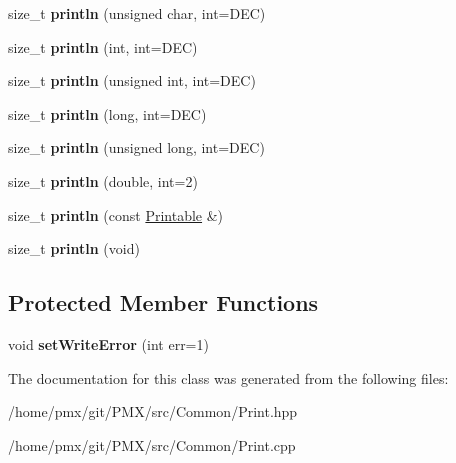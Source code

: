 \begin{DoxyCompactItemize}
size\+\_\+t {\bfseries println} (unsigned char, int=D\+EC)
\item 
\mbox{\label{classPrint_a738c88471cfb8eac7c8a804699971413}} 
size\+\_\+t {\bfseries println} (int, int=D\+EC)
\item 
\mbox{\label{classPrint_ac87eed1fcb78641169ba2244278c899e}} 
size\+\_\+t {\bfseries println} (unsigned int, int=D\+EC)
\item 
\mbox{\label{classPrint_a833fbec3ceba92e3ec95f51e026e4569}} 
size\+\_\+t {\bfseries println} (long, int=D\+EC)
\item 
\mbox{\label{classPrint_aebee3c33ee5d8f10b6f378d5273742d0}} 
size\+\_\+t {\bfseries println} (unsigned long, int=D\+EC)
\item 
\mbox{\label{classPrint_a56e976b079361b6021ef7c2bedb397a2}} 
size\+\_\+t {\bfseries println} (double, int=2)
\item 
\mbox{\label{classPrint_a20f9e104153b62e720c9b4c348b44f00}} 
size\+\_\+t {\bfseries println} (const \hyperlink{classPrintable}{Printable} \&)
\item 
\mbox{\label{classPrint_a169b128f9e22f0c15883768f580541a2}} 
size\+\_\+t {\bfseries println} (void)
\end{DoxyCompactItemize}
\subsection*{Protected Member Functions}
\begin{DoxyCompactItemize}
\item 
\mbox{\label{classPrint_a46656410e23c0ec14d7a01b38b3b6f00}} 
void {\bfseries set\+Write\+Error} (int err=1)
\end{DoxyCompactItemize}


The documentation for this class was generated from the following files\+:\begin{DoxyCompactItemize}
\item 
/home/pmx/git/\+P\+M\+X/src/\+Common/Print.\+hpp\item 
/home/pmx/git/\+P\+M\+X/src/\+Common/Print.\+cpp\end{DoxyCompactItemize}
